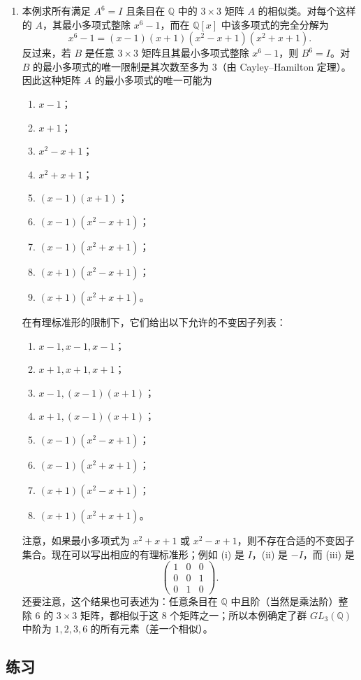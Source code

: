 \begin{enumerate}[label=(\arabic*)]
\item 本例求所有满足 $A^6=I$ 且条目在 $\mathbb Q$ 中的 $3\times3$ 矩阵 $A$ 的相似类。对每个这样的 $A$，其最小多项式整除 $x^6-1$，而在 $\mathbb Q[x]$ 中该多项式的完全分解为
\[
x^6-1=(x-1)(x+1)(x^2-x+1)(x^2+x+1).
\]
反过来，若 $B$ 是任意 $3\times3$ 矩阵且其最小多项式整除 $x^6-1$，则 $B^6=I$。对 $B$ 的最小多项式的唯一限制是其次数至多为 $3$（由 Cayley--Hamilton 定理）。因此这种矩阵 $A$ 的最小多项式的唯一可能为
\begin{enumerate}[label=(\alph*)]
\item $x-1$；
\item $x+1$；
\item $x^2-x+1$；
\item $x^2+x+1$；
\item $(x-1)(x+1)$；
\item $(x-1)(x^2-x+1)$；
\item $(x-1)(x^2+x+1)$；
\item $(x+1)(x^2-x+1)$；
\item $(x+1)(x^2+x+1)$。
\end{enumerate}
在有理标准形的限制下，它们给出以下允许的不变因子列表：
\begin{enumerate}[label=(\roman*)]
\item $x-1,x-1,x-1$；
\item $x+1,x+1,x+1$；
\item $x-1,(x-1)(x+1)$；
\item $x+1,(x-1)(x+1)$；
\item $(x-1)(x^2-x+1)$；
\item $(x-1)(x^2+x+1)$；
\item $(x+1)(x^2-x+1)$；
\item $(x+1)(x^2+x+1)$。
\end{enumerate}
注意，如果最小多项式为 $x^2+x+1$ 或 $x^2-x+1$，则不存在合适的不变因子集合。现在可以写出相应的有理标准形；例如 (i) 是 $I$，(ii) 是 $-I$，而 (iii) 是
\[
\begin{pmatrix}
1&0&0\\
0&0&1\\
0&1&0
\end{pmatrix}.
\]
还要注意，这个结果也可表述为：任意条目在 $\mathbb Q$ 中且阶（当然是乘法阶）整除 $6$ 的 $3\times3$ 矩阵，都相似于这 $8$ 个矩阵之一；所以本例确定了群 $GL_3(\mathbb Q)$ 中阶为 $1,2,3,6$ 的所有元素（差一个相似）。
\end{enumerate}

\subsection*{练习}

